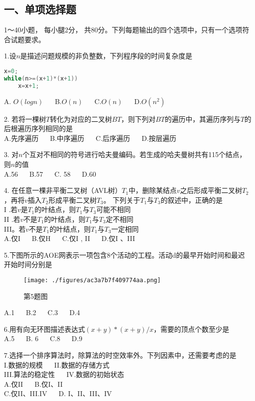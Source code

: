 
\subsection{一、单项选择题}
1～40小题， 每小腿2分， 共80分。下列每题输出的四个选项中，只有一个选项符合试题要求。

1.设$n$是描述问题规模的非负整数，下列程序段的时间复杂度是
\begin{lstlisting}[language=cpp]
x=0;
while(n>=(x+1)*(x+1))
    x=x+1;
\end{lstlisting}
A. $O(logn)$  $\quad$  B.$O(n)$  $\quad$   C.$O(n)$  $\quad$  D.$O(n^2)$

2. 若将一棵树$T$转化为对应的二叉树$BT$，则下列对$BT$的遍历中，其遍历序列与$T$的后根遍历序列相同的是 \\
A.先序遍历  $\quad$  B.中序遍历  $\quad$  C.后序遍历  $\quad$ D.按层遍历

3. 对$n$个互对不相同的符号进行哈夫曼编码。若生成的哈夫曼树共有115个结点，则$n$的值 \\
A.56  $\quad$  B.57  $\quad$  C. 58  $\quad$  D.60

4. 在任意一棵非平衡二叉树（AVL树）$T_1$中，删除某结点$v$之后形成平衡二叉树$T_2$，再将$v$插入$T_2$形成平衡二叉树$T_3$。 下列关于$T_1$与$T_3$的叙述中，正确的是 \\
I .若$v$是$T_1$的叶结点，则$T_1$与$T_3$可能不相同 \\
II .若$v$不是$T_1$的叶结点，则$T_1$与$T_3$定不相同  \\
III。若$v$不是$T_1$的叶结点，则$T_1$与$T_3$一定相同 \\
A.仅I  $\quad$  B.仅H  $\quad$ C.仅I , II  $\quad$  D.仅I 、III

5.下图所示的AOE网表示一项包含8个活动的工程。活动d的最早开始时间和最迟开始时间分别是
\begin{figure}[ht]
\centering
\texttt{[image: ./figures/ac3a7b7f409774aa.png]}
\caption{第5题图} \label{fig_CSN19_1}
\end{figure}
A.1  $\quad$  B.2  $\quad$  C.3  $\quad$  D.4

6.用有向无环图描述表达式$(x+y)*(x+y)/x$，需要的顶点个数至少是 \\
A.5  $\quad$  B. 6  $\quad$  C.8  $\quad$  D.9

7.选择一个排序算法时，除算法的时空效率外。下列因素中，还需要考虑的是 \\
I.数据的规模 $\quad$ II.数据的存储方式 \\
III.算法的稳定性 $\quad$ IV.数据的初始状态 \\
A.仅II $\quad$ B.仅I、II \\
C.仅II、III.IV $\quad$ D. I、II、III、IV

